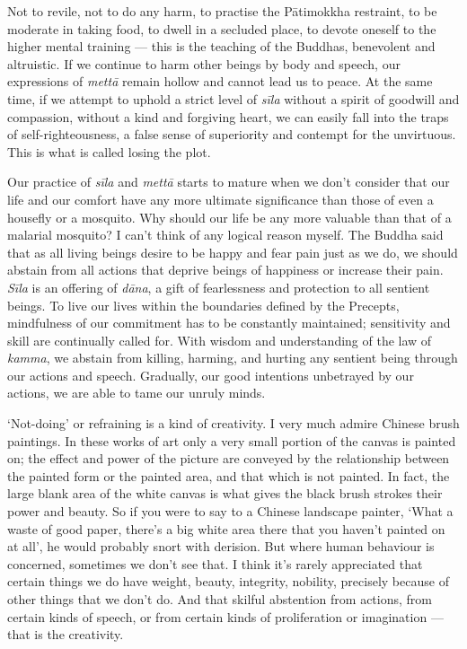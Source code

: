 Not to revile, not to do any harm, to practise the Pātimokkha restraint,
to be moderate in taking food, to dwell in a secluded place, to devote
oneself to the higher mental training --- this is the teaching of the
Buddhas, benevolent and altruistic. If we continue to harm other beings
by body and speech, our expressions of \emph{mettā} remain hollow and
cannot lead us to peace. At the same time, if we attempt to uphold a
strict level of \emph{sīla} without a spirit of goodwill and compassion,
without a kind and forgiving heart, we can easily fall into the traps of
self-righteousness, a false sense of superiority and contempt for the
unvirtuous. This is what is called losing the plot.

Our practice of \emph{sīla} and \emph{mettā} starts to mature when we
don't consider that our life and our comfort have any more ultimate
significance than those of even a housefly or a mosquito. Why should our
life be any more valuable than that of a malarial mosquito? I can't
think of any logical reason myself. The Buddha said that as all living
beings desire to be happy and fear pain just as we do, we should abstain
from all actions that deprive beings of happiness or increase their
pain. \emph{Sīla} is an offering of \emph{dāna}, a gift of fearlessness
and protection to all sentient beings. To live our lives within the
boundaries defined by the Precepts, mindfulness of our commitment has to
be constantly maintained; sensitivity and skill are continually called
for. With wisdom and understanding of the law of \emph{kamma}, we
abstain from killing, harming, and hurting any sentient being through
our actions and speech. Gradually, our good intentions unbetrayed by our
actions, we are able to tame our unruly minds.

`Not-doing' or refraining is a kind of creativity. I very much admire
Chinese brush paintings. In these works of art only a very small portion
of the canvas is painted on; the effect and power of the picture are
conveyed by the relationship between the painted form or the painted
area, and that which is not painted. In fact, the large blank area of
the white canvas is what gives the black brush strokes their power and
beauty. So if you were to say to a Chinese landscape painter, `What a
waste of good paper, there's a big white area there that you haven't
painted on at all', he would probably snort with derision. But where
human behaviour is concerned, sometimes we don't see that. I think it's
rarely appreciated that certain things we do have weight, beauty,
integrity, nobility, precisely because of other things that we don't do.
And that skilful abstention from actions, from certain kinds of speech,
or from certain kinds of proliferation or imagination --- that is the
creativity.


